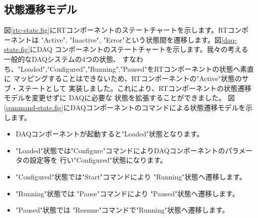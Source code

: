 \documentclass[a4j,10pt,dvips,onecolumn,oneside,final]{jarticle}%
\begin{document}
\subsection{状態遷移モデル}\label{statemodel}
図\ref{rtc-state.fig}にRTコンポーネントのステートチャートを示します。RTコンポーネントは
"Active", "Inactive", "Error"という状態間を遷移します。図\ref{daq-state.fig}にDAQ
コンポーネントのステートチャートを示します。我々の考える一般的なDAQシステムの4つの状態、
すなわち、"Loaded","Configured","Running","Paused"をRTコンポーネントの状態へ素直に
マッピングすることはできないため、RTコンポーネントの"Active"状態のサブ・ステートとして
実装しました。これにより、RTコンポーネントの状態遷移モデルを変更せずに DAQに必要な
状態を拡張することができました。
図\ref{command-state.fig}にDAQコンポーネントのコマンドによる状態遷移モデルを示します。
\begin{itemize}
\item DAQコンポーネントが起動すると"Loaded"状態となります。
\item "Loaded"状態では"Configure"コマンドによりDAQコンポーネントのパラメータの設定等を
行い"Configured"状態になります。
\item "Configured"状態では"Start"コマンドにより "Running"状態へ遷移します。
\item "Running"状態では "Pause"コマンドにより "Paused"状態へ遷移します。
\item "Paused"状態では "Resume"コマンドで"Running"状態へ遷移します。
\end{itemize}
\end{document}
